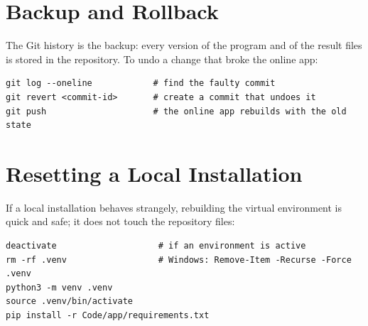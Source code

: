 \section{Backup and Rollback}
\label{sec:mtBackup}

The Git history is the backup: every version of the program and of the result files is stored in the repository. To undo a change that broke the online app:

\begin{lstlisting}[style=shell]
git log --oneline            # find the faulty commit
git revert <commit-id>       # create a commit that undoes it
git push                     # the online app rebuilds with the old state
\end{lstlisting}

\section{Resetting a Local Installation}
\label{sec:mtLocalReset}

If a local installation behaves strangely, rebuilding the virtual environment is quick and safe; it does not touch the repository files:

\begin{lstlisting}[style=shell]
deactivate                    # if an environment is active
rm -rf .venv                  # Windows: Remove-Item -Recurse -Force .venv
python3 -m venv .venv
source .venv/bin/activate
pip install -r Code/app/requirements.txt
\end{lstlisting}
